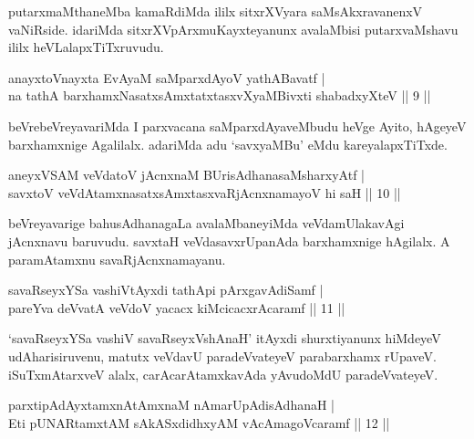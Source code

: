 \begin{artha}
putarxmaMthaneMba kamaRdiMda ililx sitxrXVyara saMsAkxravanenxV
vaNiRside. idariMda sitxrXVpArxmuKayxteyanunx avalaMbisi 
putarxvaMshavu ililx heVLalapxTiTxruvudu.
\end{artha}


\begin{shl}
anayxtoV\s nayxta EvAyaM saMparxdAyoV yathA\s Bavatf | \\
na tathA barxhamxNasatxsAmxtatxtasxvXyaMBivxti shabadxyXteV \hfill||  9 ||  
\end{shl}

\begin{artha}
beVrebeVreyavariMda I parxvacana saMparxdAyaveMbudu heVge Ayito, 
hAgeyeV barxhamxnige Agalilalx. adariMda adu `savxyaMBu' eMdu 
kareyalapxTiTxde.
\end{artha}

\begin{shl}
aneyxVSAM veVdatoV jAcnxnaM BUrisAdhanasaMsharxyAtf | \\
savxtoV veVdAtamxnasatxsAmxtasxvaRjAcnxnamayoV hi saH \hfill||  10 ||  
\end{shl}

\begin{artha}
beVreyavarige bahusAdhanagaLa avalaMbaneyiMda veVdamUlakavAgi 
jAcnxnavu baruvudu. savxtaH veVdasavxrUpanAda barxhamxnige hAgilalx. 
A paramAtamxnu savaRjAcnxnamayanu.
\end{artha}

	
\begin{shl}
savaRseyxYSa vashiVtAyxdi tathA\s pi pArxgavAdiSamf | \\
pareYva deVvatA veVdoV yacacx kiMcicacxrAcaramf \hfill||  11 ||  
\end{shl}
	
\begin{artha}
`savaRseyxYSa vashiV savaRseyxVshAnaH' itAyxdi shurxtiyanunx hiMdeyeV
udAharisi\-ruvenu, matutx veVdavU paradeVvateyeV parabarxhamx rUpaveV. 
iSuTxmAtarxveV alalx, carAcarAtamxkavAda yAvudoMdU paradeVvateyeV.
\end{artha}


\begin{shl}
parxtipAdAyx\s \s tamxnA\s \s tAmxnaM nAmarUpAdisAdhanaH | \\
Eti pUNARtamxtAM sAkASxdidhxyAM vAcAmagoVcaramf \hfill||  12 ||  
\end{shl}


